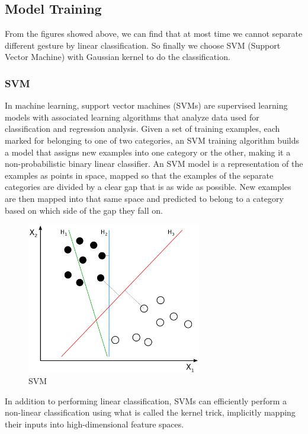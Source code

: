 \documentclass[conference]{IEEEtran}
\begin{document}
\subsection{Model Training}
From the figures showed above, we can find that at most time we cannot separate different gesture by linear classification. So finally we choose SVM (Support Vector Machine) with Gaussian kernel to do the classification.

\subsubsection{SVM}
In machine learning, support vector machines (SVMs) are supervised learning models with associated learning algorithms that analyze data used for classification and regression analysis. Given a set of training examples, each marked for belonging to one of two categories, an SVM training algorithm builds a model that assigns new examples into one category or the other, making it a non-probabilistic binary linear classifier. An SVM model is a representation of the examples as points in space, mapped so that the examples of the separate categories are divided by a clear gap that is as wide as possible. New examples are then mapped into that same space and predicted to belong to a category based on which side of the gap they fall on.
\begin{figure}[H]
\centering
\includegraphics[width=3in]{svm1.png}
\caption{SVM}
\end{figure}
In addition to performing linear classification, SVMs can efficiently perform a non-linear classification using what is called the kernel trick, implicitly mapping their inputs into high-dimensional feature spaces.
\end{document}
